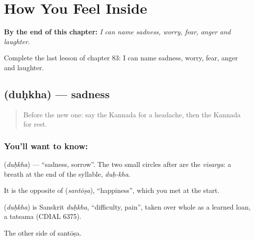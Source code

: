 
\chapter{How You Feel Inside}
\label{ch:ka-how-you-feel-inside}

\begin{chapteropening}
\textbf{By the end of this chapter:} \emph{I can name sadness, worry, fear, anger and laughter.}

Complete the last lesson of chapter 83: I can name sadness, worry, fear, anger and laughter.
\end{chapteropening}

\section[\texorpdfstring{\kn{ದುಃಖ} (duḥkha)}{ದುಃಖ (duḥkha)}]{ (duḥkha) — sadness}

\label{lesson:KA-C83-sadness}



\begin{quote}
Before the new one: say the Kannada for a headache, then the Kannada for rest.
\end{quote}

\subsection*{You'll want to know: }
\textbf{} (\emph{duḥkha}) — \textquotedblleft{}sadness, sorrow\textquotedblright{}. The two small circles \textbf{} after \textbf{} are the \emph{visarga}: a breath at the end of the syllable, \emph{duḥ-kha}.

It is the opposite of \textbf{} (\emph{santōṣa}), \textquotedblleft{}happiness\textquotedblright{}, which you met at the start.

\begin{cousinweb}
\textbf{} (\emph{duḥkha}) is Sanskrit \emph{duḥkha}, \textquotedblleft{}difficulty, pain\textquotedblright{}, taken over whole as a learned loan, a tatsama (CDIAL 6375).
\end{cousinweb}

\begin{grammarlens}[title={What you've built}]
The other side of santōṣa.
\end{grammarlens}

